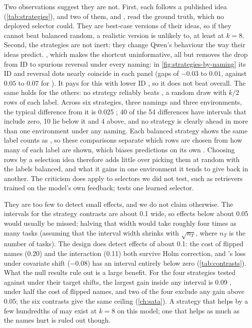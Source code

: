 Two observations suggest they are not. First, each follows a published idea (\autoref{tab:strategies}), and two of them,  and , read the ground truth, which no deployed selector could. They are best-case versions of their ideas, so if they cannot beat balanced random, a realistic version is unlikely to, at least at $k = 8$. Second, the strategies are not inert: they change Qwen's behaviour the way their ideas predict. , which makes the shortcut uninformative, all but removes the drop from ID to spurious reversal under every naming: in \autoref{fig:strategies-by-naming} its ID and reversal dots nearly coincide in each panel (gaps of $-0.03$ to $0.01$, against $0.05$ to $0.07$ for ). It pays for this with lower ID \AUROC, so it does not beat  overall. The same holds for the others: no strategy reliably beats , a random draw with $k/2$ rows of each label. Across six strategies, three namings and three environments, the typical difference from it is 0.025 \AUROC; 40 of the 54 differences have intervals that include zero, 10 lie below it and 4 above, and no strategy is clearly ahead in more than one environment under any naming. Each balanced strategy shows the same label counts as , so these comparisons separate which rows are chosen from how many of each label are shown, which biases predictions on its own \citep{zhao2021calibrate}. Choosing rows by a selection idea therefore adds little over picking them at random with the labels balanced, and what it gains in one environment it tends to give back in another. The criticism does apply to selectors we did not test, such as retrievers trained on the model's own feedback;  tests one learned selector.


They are too few to detect small effects, and we do not claim otherwise. The intervals for the strategy contrasts are about 0.1 \AUROC wide, so effects below about 0.05 would usually be missed; halving that width would take roughly four times as many tasks (assuming that the interval width shrinks with $\sqrt{n_T}$, where $n_T$ is the number of tasks). The design does detect effects of about 0.1: the cost of flipped names (0.20) and the  interaction (0.11) both survive Holm correction, and 's loss under covariate shift ($-0.08$) has an interval entirely below zero (\autoref{tab:contrasts}). What the null results rule out is a large benefit. For the four strategies tested against  under their target shifts, the largest gain inside any interval is 0.09 \AUROC, under half the cost of flipped names, and two of the four exclude any gain above 0.05; the six \sata contrasts give the same ceiling (\autoref{ch:sata}). A strategy that helps by a few hundredths of \AUROC may exist at $k = 8$ on this model; one that helps as much as the names hurt is ruled out though.

